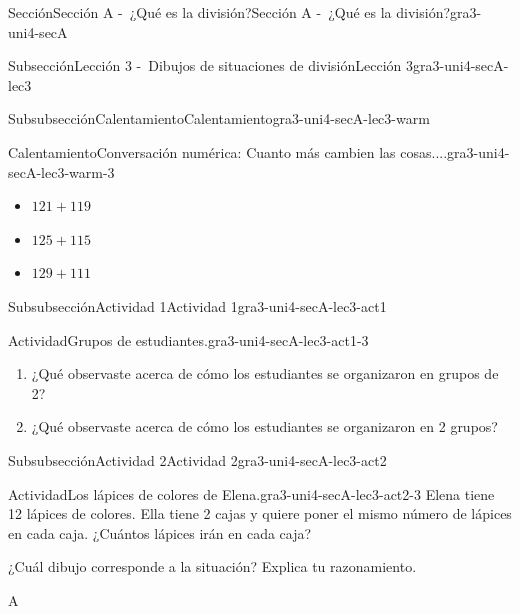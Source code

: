 \documentclass[twoside,10pt,]{article}
\begin{document}
\begin{sectionptx}{Sección}{Sección A -~¿Qué es la división?}{}{Sección A -~¿Qué es la división?}{}{}{gra3-uni4-secA}
\begin{subsectionptx}{Subsección}{Lección 3 -~Dibujos de situaciones de división}{}{Lección 3}{}{}{gra3-uni4-secA-lec3}
\begin{subsubsectionptx}{Subsubsección}{Calentamiento}{}{Calentamiento}{}{}{gra3-uni4-secA-lec3-warm}
\begin{exploration}{Calentamiento}{Conversación numérica: Cuanto más cambien las cosas....}{gra3-uni4-secA-lec3-warm-3}
\begin{itemize}[label=\textbullet]
\item{}\(\displaystyle 121 + 119\)%
\item{}\(\displaystyle 125 + 115\)%
\item{}\(\displaystyle 129 + 111\)%
\end{itemize}
%
\end{exploration}%
\end{subsubsectionptx}
%
%
\typeout{************************************************}
\typeout{************************************************}
%
\begin{subsubsectionptx}{Subsubsección}{Actividad 1}{}{Actividad 1}{}{}{gra3-uni4-secA-lec3-act1}
\begin{activity}{Actividad}{Grupos de estudiantes.}{gra3-uni4-secA-lec3-act1-3}%
%
\begin{enumerate}
\item{}¿Qué observaste acerca de cómo los estudiantes se organizaron en grupos de 2?%
\item{}¿Qué observaste acerca de cómo los estudiantes se organizaron en 2 grupos?%
\end{enumerate}
%
\end{activity}%
\end{subsubsectionptx}
%
%
\typeout{************************************************}
\typeout{************************************************}
%
\begin{subsubsectionptx}{Subsubsección}{Actividad 2}{}{Actividad 2}{}{}{gra3-uni4-secA-lec3-act2}
\begin{activity}{Actividad}{Los lápices de colores de Elena.}{gra3-uni4-secA-lec3-act2-3}%
Elena tiene 12 lápices de colores. Ella tiene 2 cajas y quiere poner el mismo número de lápices en cada caja. ¿Cuántos lápices irán en cada caja?%
\par
¿Cuál dibujo corresponde a la situación? Explica tu razonamiento.%
\begin{sidebyside}{2}{0}{0}{0}%
\begin{sbspanel}{0.5}%
A%
\par

\end{sbspanel}
\end{sidebyside}
\end{activity}
\end{subsubsectionptx}
\end{subsectionptx}
\end{sectionptx}
\end{document}
